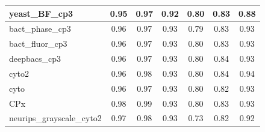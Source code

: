 \documentclass[./dissertation.tex]{subfiles}
\begin{document}
\begin{table}[!ht]
\begin{tabular}{|l|c|c|c|c|c|c|}
    yeast\_BF\_cp3            & 0.95                                    & 0.97                                        & 0.92                                    & 0.80                                  & 0.83                                   & 0.88                                    \\ \hline
    bact\_phase\_cp3          & 0.96                                    & 0.97                                        & 0.93                                    & 0.79                                  & 0.83                                   & 0.93                                    \\ \hline
    bact\_fluor\_cp3          & 0.96                                    & 0.97                                        & 0.93                                    & 0.80                                  & 0.83                                   & 0.93                                    \\ \hline
    deepbacs\_cp3             & 0.96                                    & 0.97                                        & 0.93                                    & 0.80                                  & 0.84                                   & 0.93                                    \\ \hline
    cyto2                     & 0.96                                    & 0.98                                        & 0.93                                    & 0.80                                  & 0.84                                   & 0.94                                    \\ \hline
    cyto                      & 0.96                                    & 0.97                                        & 0.93                                    & 0.80                                  & 0.82                                   & 0.93                                    \\ \hline
    CPx                       & 0.98                                    & 0.99                                        & 0.93                                    & 0.80                                  & 0.83                                   & 0.93                                    \\ \hline
    neurips\_grayscale\_cyto2 & 0.97                                    & 0.98                                        & 0.93                                    & 0.73                                  & 0.82                                   & 0.92                                    \\ \hline

\end{tabular}
\end{table}
\end{document}
